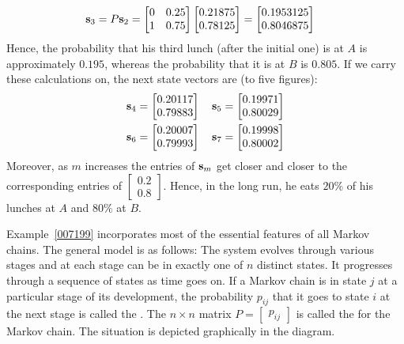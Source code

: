 \documentclass{ximera}
\begin{document}
\begin{example}
\begin{explanation}
\begin{align*}
{\bf s}_{3} &= P{\bf s}_2 = \begin{bmatrix}
0 & 0.25 \\
1 & 0.75
\end{bmatrix}
\begin{bmatrix}
0.21875 \\
0.78125
\end{bmatrix} =
\begin{bmatrix}
0.1953125 \\
0.8046875
\end{bmatrix}
\end{align*}
Hence, the probability that his third lunch (after the initial one) is at $A$ is approximately $0.195$, whereas the probability that it is at $B$ is $0.805$. If we carry these calculations on, the next state vectors are (to five figures):
\begin{align*}
{\bf s}_4 &= \begin{bmatrix}
0.20117 \\
0.79883
\end{bmatrix}
\quad {\bf s}_5 = \begin{bmatrix}
0.19971 \\
0.80029
\end{bmatrix} \\
{\bf s}_6 &= \begin{bmatrix}
0.20007 \\
0.79993
\end{bmatrix} \quad {\bf s}_7 = \begin{bmatrix}
0.19998 \\
0.80002
\end{bmatrix}
\end{align*}
Moreover, as $m$ increases the entries of ${\bf s}_{m}$ get closer and closer to the corresponding entries of $\begin{bmatrix}
0.2 \\
0.8
\end{bmatrix}$.
 Hence, in the long run, he eats $20\%$ of his lunches at $A$ and $80\%$ at $B$.
\end{explanation}
\end{example}


%


Example~\ref{007199} incorporates most of the essential features of all Markov chains. The general model is as follows: The system evolves through various stages and at each stage can be in exactly one of $n$ distinct states. It progresses through a sequence of states as time goes on. If a Markov chain is in state $j$ at a particular stage of its development, the probability $p_{ij}$ that it goes to state $i$ at the next stage is called the . The $n \times n$ matrix $P = \begin{bmatrix}
p_{ij}
\end{bmatrix}$ is called the  for the Markov chain. The situation is depicted graphically in the diagram.
\end{document}
